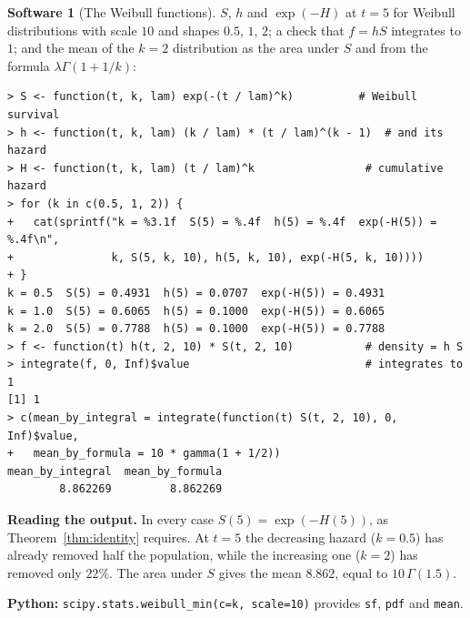 \documentclass[11pt,a4paper]{article}
\numberwithin{equation}{section}
\theoremstyle{definition}
\newtheorem{software}[thm]{Software}
\begin{document}
\begin{software}[The Weibull functions]
\label{sw:weibull}
$S$, $h$ and $\exp(-H)$ at $t = 5$ for Weibull distributions with scale $10$ and shapes $0.5$, $1$, $2$; a check that $f = hS$ integrates to $1$; and the mean of the $k = 2$ distribution as the area under $S$ and from the formula $\lambda\Gamma(1 + 1/k)$:
{\small\begin{verbatim}
> S <- function(t, k, lam) exp(-(t / lam)^k)          # Weibull survival
> h <- function(t, k, lam) (k / lam) * (t / lam)^(k - 1)  # and its hazard
> H <- function(t, k, lam) (t / lam)^k                 # cumulative hazard
> for (k in c(0.5, 1, 2)) {
+   cat(sprintf("k = %3.1f  S(5) = %.4f  h(5) = %.4f  exp(-H(5)) = %.4f\n",
+               k, S(5, k, 10), h(5, k, 10), exp(-H(5, k, 10))))
+ }
k = 0.5  S(5) = 0.4931  h(5) = 0.0707  exp(-H(5)) = 0.4931
k = 1.0  S(5) = 0.6065  h(5) = 0.1000  exp(-H(5)) = 0.6065
k = 2.0  S(5) = 0.7788  h(5) = 0.1000  exp(-H(5)) = 0.7788
> f <- function(t) h(t, 2, 10) * S(t, 2, 10)           # density = h S
> integrate(f, 0, Inf)$value                           # integrates to 1
[1] 1
> c(mean_by_integral = integrate(function(t) S(t, 2, 10), 0, Inf)$value,
+   mean_by_formula = 10 * gamma(1 + 1/2))
mean_by_integral  mean_by_formula 
        8.862269         8.862269 
\end{verbatim}}
\textbf{Reading the output.} In every case $S(5) = \exp(-H(5))$, as Theorem~\ref{thm:identity} requires. At $t = 5$ the decreasing hazard ($k = 0.5$) has already removed half the population, while the increasing one ($k = 2$) has removed only $22\%$. The area under $S$ gives the mean $8.862$, equal to $10\,\Gamma(1.5)$.

\textbf{Python:} \texttt{scipy.stats.weibull\_min(c=k, scale=10)} provides \texttt{sf}, \texttt{pdf} and \texttt{mean}.
\end{software}
\end{document}
